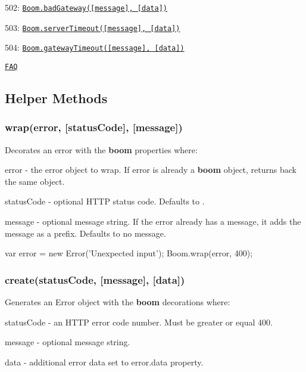 \begin{DoxyItemize}
\begin{DoxyItemize}
\item 502\+: \href{#boombadgatewaymessage-data}{\tt {\ttfamily Boom.\+bad\+Gateway(\mbox{[}message\mbox{]}, \mbox{[}data\mbox{]})}}
\item 503\+: \href{#boomservertimeoutmessage-data}{\tt {\ttfamily Boom.\+server\+Timeout(\mbox{[}message\mbox{]}, \mbox{[}data\mbox{]})}}
\item 504\+: \href{#boomgatewaytimeoutmessage-data}{\tt {\ttfamily Boom.\+gateway\+Timeout(\mbox{[}message\mbox{]}, \mbox{[}data\mbox{]})}}
\end{DoxyItemize}
\item \href{#faq}{\tt F\+AQ}
\end{DoxyItemize}

\subsection*{Helper Methods}

\subsubsection*{{\ttfamily wrap(error, \mbox{[}status\+Code\mbox{]}, \mbox{[}message\mbox{]})}}

Decorates an error with the {\bfseries boom} properties where\+:
\begin{DoxyItemize}
\item {\ttfamily error} -\/ the error object to wrap. If {\ttfamily error} is already a {\bfseries boom} object, returns back the same object.
\item {\ttfamily status\+Code} -\/ optional H\+T\+TP status code. Defaults to {}.
\item {\ttfamily message} -\/ optional message string. If the error already has a message, it adds the message as a prefix. Defaults to no message.
\end{DoxyItemize}


\begin{DoxyCode}
var error = new Error('Unexpected input');
Boom.wrap(error, 400);
\end{DoxyCode}


\subsubsection*{{\ttfamily create(status\+Code, \mbox{[}message\mbox{]}, \mbox{[}data\mbox{]})}}

Generates an {\ttfamily Error} object with the {\bfseries boom} decorations where\+:
\begin{DoxyItemize}
\item {\ttfamily status\+Code} -\/ an H\+T\+TP error code number. Must be greater or equal 400.
\item {\ttfamily message} -\/ optional message string.
\item {\ttfamily data} -\/ additional error data set to {\ttfamily error.\+data} property.
\end{DoxyItemize}


